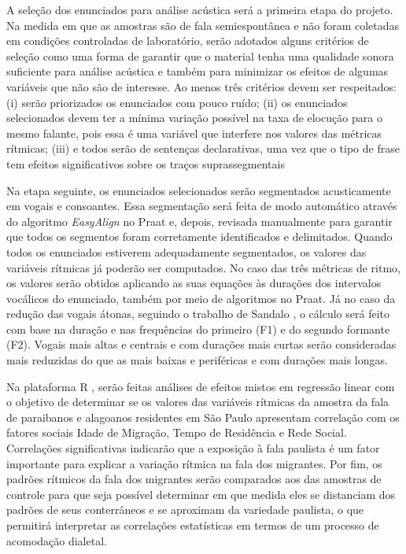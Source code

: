 \documentclass[a4paper, 12pt, article, oneside, brazil,leqno]{memoir}
\begin{document}
A seleção dos enunciados para análise acústica será a primeira etapa do projeto. Na medida em que as amostras são de fala semiespontânea e não foram coletadas em condições controladas de laboratório, serão adotados alguns critérios de seleção como uma forma de garantir que o material tenha uma qualidade sonora suficiente para análise acústica e também para minimizar os efeitos de algumas variáveis que não são de interesse. Ao menos três critérios devem ser respeitados: (i) serão priorizados os enunciados com pouco ruído; (ii) os enunciados selecionados devem ter a mínima variação possível na taxa de elocução para o mesmo falante, pois essa é uma variável que interfere nos valores das métricas rítmicas; (iii) e todos serão de sentenças declarativas, uma vez que o tipo de frase tem efeitos significativos sobre os traços suprassegmentais \cite{fuchs2016}

Na etapa seguinte, os enunciados selecionados serão segmentados acusticamente em vogais e consoantes. Essa segmentação será feita de modo automático através do algoritmo \emph{EasyAlign} no Praat e, depois, revisada manualmente para garantir que todos os segmentos foram corretamente identificados e delimitados. Quando todos os enunciados estiverem adequadamente segmentados, os valores das variáveis rítmicas já poderão ser computados. No caso das três métricas de ritmo, os valores serão obtidos aplicando as suas equações às durações dos intervalos vocálicos do enunciado, também por meio de algoritmos no Praat. Já no caso da redução das vogais átonas, seguindo o trabalho de Sandalo \citeyear{sandalo2012}, o cálculo será feito com base na duração e nas frequências do primeiro (F1) e do segundo formante (F2). Vogais mais altas e centrais e com durações mais curtas serão consideradas mais reduzidas do que as mais baixas e periféricas e com durações mais longas. 

Na plataforma R \cite{rcoreteam2019}, serão feitas análises de efeitos mistos em regressão linear com o objetivo de determinar se os valores das variáveis rítmicas da amostra da fala de paraibanos e alagoanos residentes em São Paulo apresentam correlação com os fatores sociais Idade de Migração, Tempo de Residência e Rede Social. Correlações significativas indicarão que a exposição à fala paulista é um fator importante para explicar a variação rítmica na fala dos migrantes. Por fim, os padrões rítmicos da fala dos migrantes serão comparados aos das amostras de controle para que seja possível determinar em que medida eles se distanciam dos padrões de seus conterrâneos e se aproximam da variedade paulista, o que permitirá interpretar as correlações estatísticas em termos de um processo de acomodação dialetal.
\end{document}
